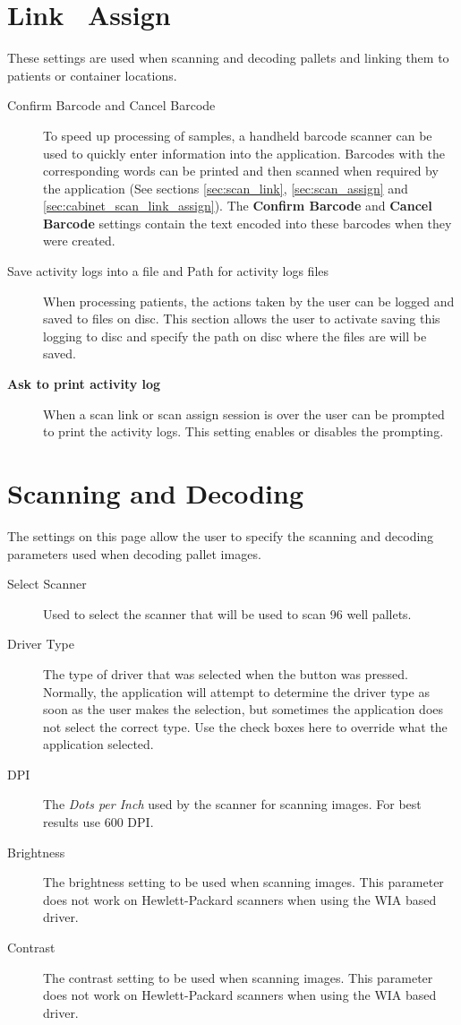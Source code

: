 \section{Link \ Assign}
These settings are used when scanning and decoding pallets and linking them to
patients or container locations.
\marginpar{\color{red}{There should  be an appendix with instructions on how to create
  these barcodes.}}
\begin{description}
  \item[Confirm Barcode and Cancel Barcode] To speed up
    processing of samples, a handheld barcode scanner can be used to quickly
    enter information into the application. Barcodes with the corresponding
    words can be printed and then scanned when required by the application (See
    sections \ref{sec:scan_link}, \ref{sec:scan_assign} and
    \ref{sec:cabinet_scan_link_assign}). The \textbf{Confirm Barcode} and
    \textbf{Cancel Barcode} settings contain the text encoded into these
    barcodes when they were created.
  \item [Save activity logs into a file and Path for activity logs files] When
    processing patients, the actions taken by the user can be logged and saved
    to files on disc. This section allows the user to activate saving this
    logging to disc and specify the path on disc where the files are will be
    saved.
  \item[\textbf{Ask to print activity log}] When a scan link or scan assign
    session is over the user can be prompted to print the activity logs. This
    setting enables or disables the prompting.
\end{description}

\section{Scanning and Decoding}
The settings on this page allow the user to specify the scanning and
decoding parameters used when decoding pallet images.
\begin{description}
  \item[Select Scanner]
 Used to select the scanner that will be used to scan
    96 well pallets.
  \item[Driver Type] The type of driver that was selected when the  button was pressed. Normally, the application will attempt to
    determine the driver type as soon as the user makes the selection, but
    sometimes the application does not select the correct type. Use the
    check boxes here to override what the application selected.
  \item[DPI] The \emph{Dots per Inch} used by the scanner for scanning
    images. For best results use 600 DPI.
  \item[Brightness] The brightness setting to be used when scanning
    images. This parameter does not work on Hewlett-Packard scanners when using
    the WIA based driver.
  \item[Contrast] The contrast setting to be used when scanning
    images. This parameter does not work on Hewlett-Packard scanners when using
    the WIA based driver.
\end{description}

